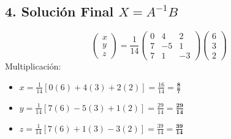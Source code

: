 \documentclass{article}
\begin{document}
	\subsection*{4. Solución Final $X = A^{-1}B$}
	\[
	\begin{pmatrix} x \\ y \\ z \end{pmatrix} = \frac{1}{14} \begin{pmatrix} 0 & 4 & 2 \\ 7 & -5 & 1 \\ 7 & 1 & -3 \end{pmatrix} \begin{pmatrix} 6 \\ 3 \\ 2 \end{pmatrix}
	\]
	Multiplicación:
	\begin{itemize}
		\item $x = \frac{1}{14} [0(6) + 4(3) + 2(2)] = \frac{16}{14} = \mathbf{\frac{8}{7}}$
		\item $y = \frac{1}{14} [7(6) - 5(3) + 1(2)] = \frac{29}{14} = \mathbf{\frac{29}{14}}$
		\item $z = \frac{1}{14} [7(6) + 1(3) - 3(2)] = \frac{39}{14} = \mathbf{\frac{39}{14}}$
	\end{itemize}
	
\end{document}
